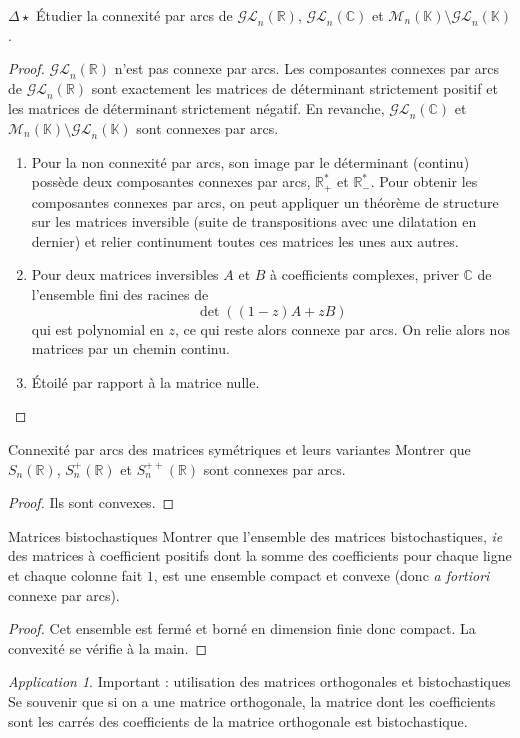 \documentclass[french,a4paper]{article}
\newcommand{\R}{\mathbb{R}}
\newcommand{\C}{\mathbb{C}}
\newcommand{\K}{\mathbb{K}}
\newcommand{\st}{^*}
\theoremstyle{plain}
\theoremstyle{definition}
\theoremstyle{remark}
\newtheorem*{app}{Application}
\begin{document}
\begin{ex}[Moulin.50]{$\Delta\star$}
	Étudier la connexité par arcs de $\mathcal{GL}_n(\R)$, $\mathcal{GL}_n(\C)$ et $\mathcal{M}_n(\K)\setminus\mathcal{GL}_n(\K)$.
\end{ex}
\begin{proof}
	$\mathcal{GL}_n(\R)$ n'est pas connexe par arcs. Les composantes connexes par arcs de $\mathcal{GL}_n(\R)$ sont exactement les matrices de déterminant strictement positif et les matrices de déterminant strictement négatif. En revanche, $\mathcal{GL}_n(\C)$ et $\mathcal{M}_n(\K)\setminus\mathcal{GL}_n(\K)$ sont connexes par arcs.
	\begin{enumerate}
		\item Pour la non connexité par arcs, son image par le déterminant (continu) possède deux composantes connexes par arcs, $\R_+\st$ et $\R_-\st$. Pour obtenir les composantes connexes par arcs, on peut appliquer un théorème de structure sur les matrices inversible (suite de transpositions avec une dilatation en dernier) et relier continument toutes ces matrices les unes aux autres.
		\item Pour deux matrices inversibles $A$ et $B$ à coefficients complexes, priver $\C$ de l'ensemble fini des racines de $$\det((1-z)A+zB)$$ qui est polynomial en $z$, ce qui reste alors connexe par arcs. On relie alors nos matrices par un chemin continu.
		\item Étoilé par rapport à la matrice nulle.
	\end{enumerate}
\end{proof}

\begin{ex}{Connexité par arcs des matrices symétriques et leurs variantes}
	Montrer que $S_n(\R)$, $S_n^+(\R)$ et $S_n^{++}(\R)$ sont connexes par arcs.
\end{ex}
\begin{proof}
	Ils sont convexes.
\end{proof}

\begin{ex}{Matrices bistochastiques} 
	Montrer que l'ensemble des matrices bistochastiques, \textit{ie} des matrices à coefficient positifs dont la somme des coefficients pour chaque ligne et chaque colonne fait $1$, est une ensemble compact et convexe (donc \textit{a fortiori} connexe par arcs).
\end{ex}
\begin{proof}
	Cet ensemble est fermé et borné en dimension finie donc compact. La convexité se vérifie à la main.
\end{proof}
\begin{app}{Important : utilisation des matrices orthogonales et bistochastiques}
	Se souvenir que si on a une matrice orthogonale, la matrice dont les coefficients sont les carrés des coefficients de la matrice orthogonale est bistochastique.
\end{app}
\end{document}
